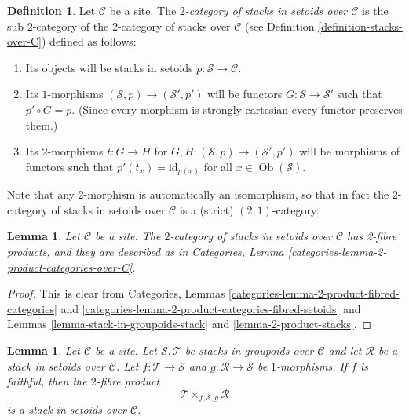 \documentclass{stacks-project}
\theoremstyle{plain}
\newtheorem{lemma}[subsection]{Lemma}
\theoremstyle{definition}
\newtheorem{definition}[subsection]{Definition}
\theoremstyle{remark}
\numberwithin{equation}{subsection}
\def\Ob{\mathop{\mathrm{Ob}}\nolimits}
\begin{document}
\begin{definition}
\label{definition-stacks-in-setoids-over-C}
Let $\mathcal{C}$ be a site.
The {\it $2$-category of stacks in setoids over $\mathcal{C}$}
is the sub $2$-category of the $2$-category of stacks
over $\mathcal{C}$ (see Definition \ref{definition-stacks-over-C})
defined as follows:
\begin{enumerate}
\item Its objects will be stacks in setoids
$p : \mathcal{S} \to \mathcal{C}$.
\item Its $1$-morphisms $(\mathcal{S}, p) \to (\mathcal{S}', p')$
will be functors $G : \mathcal{S} \to \mathcal{S}'$ such that
$p' \circ G = p$. (Since every morphism is strongly cartesian
every functor preserves them.)
\item Its $2$-morphisms $t : G \to H$ for
$G, H : (\mathcal{S}, p) \to (\mathcal{S}', p')$
will be morphisms of functors
such that $p'(t_x) = \text{id}_{p(x)}$
for all $x \in \Ob(\mathcal{S})$.
\end{enumerate}
\end{definition}

\noindent
Note that any $2$-morphism is automatically an isomorphism, so
that in fact the $2$-category of stacks in setoids over $\mathcal{C}$
is a (strict) $(2, 1)$-category.

\begin{lemma}
\label{lemma-2-product-stacks-in-setoids}
Let $\mathcal{C}$ be a site.
The $2$-category of stacks in setoids over $\mathcal{C}$
has 2-fibre products, and they are described as in
Categories, Lemma \ref{categories-lemma-2-product-categories-over-C}.
\end{lemma}

\begin{proof}
This is clear from
Categories, Lemmas \ref{categories-lemma-2-product-fibred-categories} and
\ref{categories-lemma-2-product-categories-fibred-setoids}
and
Lemmas \ref{lemma-stack-in-groupoids-stack} and
\ref{lemma-2-product-stacks}.
\end{proof}

\begin{lemma}
\label{lemma-2-fibre-product-gives-stack-in-setoids}
Let $\mathcal{C}$ be a site.
Let $\mathcal{S}, \mathcal{T}$ be stacks in groupoids over $\mathcal{C}$
and let $\mathcal{R}$ be a stack in setoids over $\mathcal{C}$.
Let $f : \mathcal{T} \to \mathcal{S}$ and $g : \mathcal{R} \to \mathcal{S}$
be $1$-morphisms. If $f$ is faithful, then the $2$-fibre product
$$
\mathcal{T} \times_{f, \mathcal{S}, g} \mathcal{R}
$$
is a stack in setoids over $\mathcal{C}$.
\end{lemma}
\end{document}
